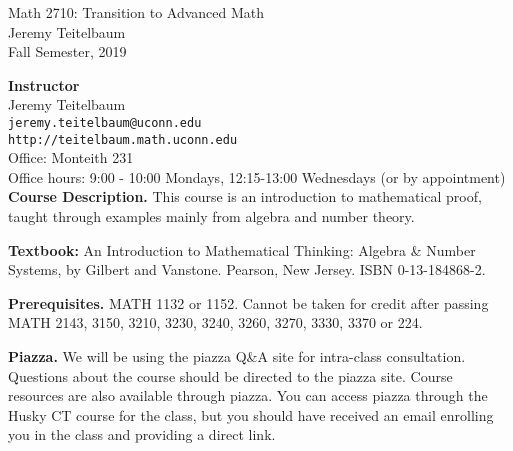 \documentclass[12pt]{article}
\begin{document}
\begin{center} Math 2710: Transition to Advanced Math \\
Jeremy Teitelbaum \\ Fall Semester, 2019
\end{center}

{\bf Instructor}\\
Jeremy Teitelbaum \\
{\tt jeremy.teitelbaum@uconn.edu} \\
{\tt http://teitelbaum.math.uconn.edu} \\
Office: Monteith 231 \\
Office hours: 9:00 - 10:00 Mondays, 12:15-13:00 Wednesdays (or by appointment) \\


{\bf Course Description.} This course is an introduction to mathematical proof, taught through examples mainly from
algebra and number theory.  

{\bf Textbook:} An Introduction to Mathematical Thinking: Algebra \& Number Systems, by Gilbert and Vanstone. Pearson, New Jersey.
ISBN 0-13-184868-2.

{\bf Prerequisites.} MATH 1132 or 1152. Cannot be taken for credit after passing MATH 2143, 3150, 3210, 3230, 3240, 3260, 3270, 3330, 3370 or 224. 

{\bf Piazza.}  We will be using the piazza Q\&A site for intra-class consultation.  Questions about the course should be directed to the piazza site. Course resources are also available through piazza.  You can access piazza through the Husky CT course for the class, but you should have received an email enrolling you in the class and providing a direct link.

\vfill\eject
\end{document}
